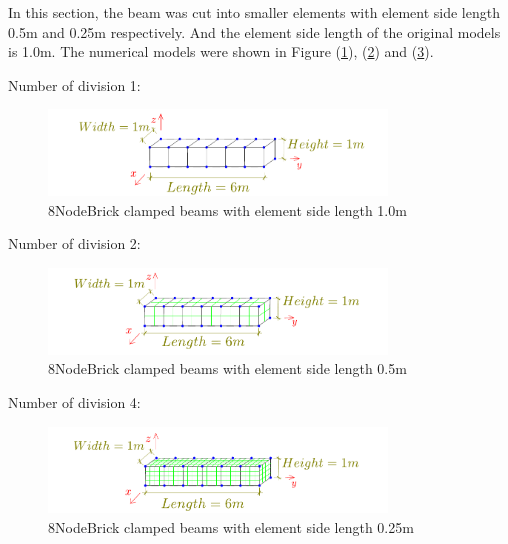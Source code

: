 \documentclass[fleqn,11pt,letter]{article}
\begin{document}
\newpage
In this section, the beam was cut into smaller elements with element side length 0.5m and 0.25m respectively. And the element side length of the original models is 1.0m. The numerical models were shown in Figure (\ref{fig 8NodeBrick clamped beams with element side length 1.0m}), (\ref{fig 8NodeBrick clamped beams with element side length 0.5m}) and (\ref{fig 8NodeBrick clamped beams with element side length 0.25m}). 

Number of division 1:

\begin{figure}[H]
  \centering
  \includegraphics[width=9cm]{../Figure_files/8NodeBrick/beam_8brick.pdf}
  \caption{8NodeBrick clamped beams with element side length 1.0m}
  \label{fig 8NodeBrick clamped beams with element side length 1.0m}
\end{figure}

Number of division 2:

\begin{figure}[H]
  \centering
  \includegraphics[width=9cm]{../Figure_files/8NodeBrick/beam_8brick_more_2.pdf}
  \caption{8NodeBrick clamped beams with element side length 0.5m}
  \label{fig 8NodeBrick clamped beams with element side length 0.5m}
\end{figure}

Number of division 4:

\begin{figure}[H]
  \centering
  \includegraphics[width=9cm]{../Figure_files/8NodeBrick/beam_8brick_more.pdf}
  \caption{8NodeBrick clamped beams with element side length 0.25m}
  \label{fig 8NodeBrick clamped beams with element side length 0.25m}
\end{figure}
\end{document}
